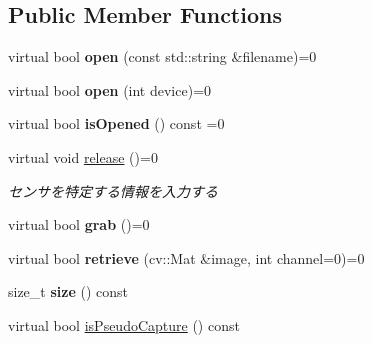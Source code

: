 \subsection*{Public Member Functions}
\begin{DoxyCompactItemize}
\item 
\hypertarget{classskl_1_1___video_capture_interface_a6212124bf4488c7b17255a2689a32d64}{}\label{classskl_1_1___video_capture_interface_a6212124bf4488c7b17255a2689a32d64} 
virtual bool {\bfseries open} (const std\+::string \&filename)=0
\item 
\hypertarget{classskl_1_1___video_capture_interface_a62596ea37320dd4790e5e37912c44cda}{}\label{classskl_1_1___video_capture_interface_a62596ea37320dd4790e5e37912c44cda} 
virtual bool {\bfseries open} (int device)=0
\item 
\hypertarget{classskl_1_1___video_capture_interface_a4130707d281129aa9eb648ac9b6b99d2}{}\label{classskl_1_1___video_capture_interface_a4130707d281129aa9eb648ac9b6b99d2} 
virtual bool {\bfseries is\+Opened} () const =0
\item 
\hypertarget{classskl_1_1___video_capture_interface_a9d3990d3cd85cbfbe70ce8d6565a3dea}{}\label{classskl_1_1___video_capture_interface_a9d3990d3cd85cbfbe70ce8d6565a3dea} 
virtual void \hyperlink{classskl_1_1___video_capture_interface_a9d3990d3cd85cbfbe70ce8d6565a3dea}{release} ()=0
\begin{DoxyCompactList}\small\item\em センサを特定する情報を入力する \end{DoxyCompactList}\item 
\hypertarget{classskl_1_1___video_capture_interface_a0dc57d91df8cee80a3e0c5cc09814ec1}{}\label{classskl_1_1___video_capture_interface_a0dc57d91df8cee80a3e0c5cc09814ec1} 
virtual bool {\bfseries grab} ()=0
\item 
\hypertarget{classskl_1_1___video_capture_interface_a915ccf5860023e3277abfd0c5d85eb14}{}\label{classskl_1_1___video_capture_interface_a915ccf5860023e3277abfd0c5d85eb14} 
virtual bool {\bfseries retrieve} (cv\+::\+Mat \&image, int channel=0)=0
\item 
\hypertarget{classskl_1_1___video_capture_interface_aef1026d5becac43d49f341dceff4440d}{}\label{classskl_1_1___video_capture_interface_aef1026d5becac43d49f341dceff4440d} 
size\+\_\+t {\bfseries size} () const
\item 
virtual bool \hyperlink{classskl_1_1___video_capture_interface_acf6bb54ae5d4bcee82029b36c8ae17bf}{is\+Pseudo\+Capture} () const
\item 

\end{DoxyCompactItemize}
